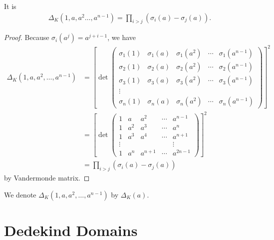 \begin{thmbox}
    \begin{proposition}
        It is
        \begin{align*}
            \Delta_K(1, a, a^2 \ldots, a^{n-1}) = \prod_{i > j} (\sigma_i(a) - \sigma_j(a)) \text{.}
        \end{align*}
    \end{proposition}
\end{thmbox}
\begin{proof}
    Because \(\sigma_i(a^j) = a^{j + i - 1}\), we have
    \begin{align*}
        \Delta_K(1, a, a^2, \ldots, a^{n-1}) &= \left[\det \begin{pmatrix}
            \sigma_1(1) & \sigma_1(a) & \sigma_1(a^2) & \cdots & \sigma_1(a^{n-1}) \\
            \sigma_2(1) & \sigma_2(a) & \sigma_2(a^2) & \cdots & \sigma_2(a^{n-1}) \\
            \sigma_3(1) & \sigma_3(a) & \sigma_3(a^2) & \cdots & \sigma_3(a^{n-1}) \\
            \vdots & & & & \\
            \sigma_n(1) & \sigma_n(a) & \sigma_n(a^2) & \cdots & \sigma_n(a^{n-1})
        \end{pmatrix}\right]^2 \\
        &= \left[\det \begin{pmatrix}
            1 & a & a^2 & \cdots & a^{n-1} \\
            1 & a^2 & a^3 & \cdots & a^n \\
            1 & a^3 & a^4 & \cdots & a^{n+1} \\
            \vdots & & & & \vdots \\
            1 & a^n & a^{n+1} & \cdots & a^{2n - 1}
        \end{pmatrix}\right]^2 \\
        &= \prod_{i>j} (\sigma_i(a) - \sigma_j(a))
    \end{align*}
    by Vandermonde matrix.
\end{proof}
\begin{rembox}
    \begin{remark}
        We denote \(\Delta_K(1, a, a^2, \ldots, a^{n-1})\) by \(\Delta_K(a)\).
    \end{remark}
\end{rembox}

\chapter{Dedekind Domains}

